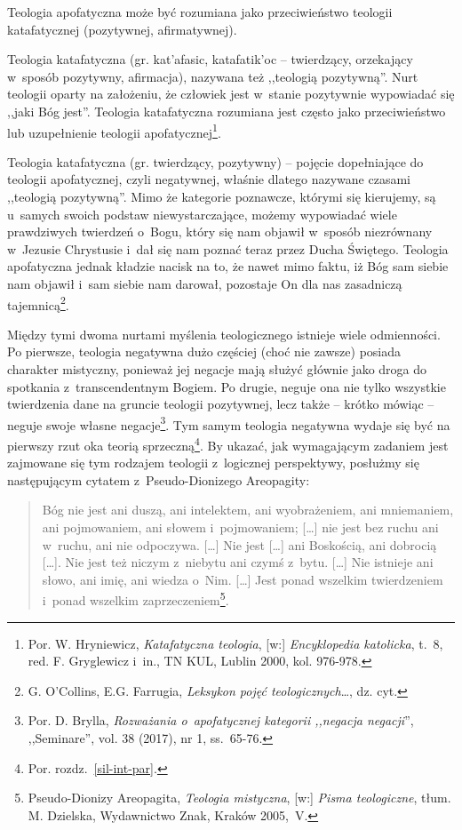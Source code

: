 Teologia apofatyczna może być rozumiana jako przeciwieństwo teologii katafatycznej (pozytywnej, afirmatywnej).


\begin{defin}
Teologia katafatyczna (gr. \textgreek{kat'afasic}, \textgreek{katafatik'oc}  -- twierdzący, orzekający w~sposób pozytywny, afirmacja), nazywana też ,,teologią pozytywną''. Nurt teologii oparty na założeniu, że człowiek jest w~stanie pozytywnie wypowiadać się ,,jaki Bóg jest''. Teologia katafatyczna rozumiana jest często jako przeciwieństwo lub uzupełnienie teologii apofatycznej\footnote{Por. W. Hryniewicz, \textit{Katafatyczna teologia}, [w:] \textit{Encyklopedia katolicka}, t.~8, red. F. Gryglewicz i~in., TN KUL, Lublin 2000, kol. 976-978.}.
\end{defin}
\begin{defin}
Teologia katafatyczna (gr. twierdzący, pozytywny) -- pojęcie dopełniające do teologii apofatycznej, czyli negatywnej, właśnie dlatego nazywane czasami ,,teologią pozytywną''. Mimo że kategorie poznawcze, którymi się kierujemy, są u~samych swoich podstaw niewystarczające, możemy wypowiadać wiele prawdziwych twierdzeń o~Bogu, który się nam objawił w~sposób niezrównany w~Jezusie Chrystusie i~dał się nam poznać teraz przez Ducha Świętego. Teologia apofatyczna jednak kładzie nacisk na to, że nawet mimo faktu, iż Bóg sam siebie nam objawił i~sam siebie nam darował, pozostaje On dla nas zasadniczą tajemnicą\footnote{G. O'Collins, E.G. Farrugia, \textit{Leksykon pojęć teologicznych}\ldots, dz. cyt.}.
\end{defin}

Między tymi dwoma nurtami myślenia teologicznego istnieje wiele odmienności. Po pierwsze, teologia negatywna dużo częściej (choć nie zawsze) posiada charakter mistyczny, ponieważ jej negacje mają służyć głównie jako droga do spotkania z~transcendentnym Bogiem. Po drugie, neguje ona nie tylko wszystkie twierdzenia dane na gruncie teologii pozytywnej, lecz także -- krótko mówiąc -- neguje swoje własne negacje\footnote{Por. D. Brylla, \textit{Rozważania o~apofatycznej kategorii ,,negacja negacji}'', ,,Seminare'', vol. 38 (2017), nr 1, ss.~65-76.}. Tym samym teologia negatywna wydaje się być na pierwszy rzut oka teorią sprzeczną\footnote{Por. rozdz.~\ref{sil-int-par}.}. By ukazać, jak wymagającym zadaniem jest zajmowane się tym rodzajem teologii z~logicznej perspektywy, posłużmy się następującym cytatem z~Pseudo-Dionizego Areopagity:

\begin{quote}
Bóg nie jest ani duszą, ani intelektem, ani wyobrażeniem, ani mniemaniem, ani pojmowaniem, ani słowem i~pojmowaniem; [\ldots] nie jest bez ruchu ani w~ruchu, ani nie odpoczywa. [\ldots] Nie jest [\ldots] ani Boskością, ani dobrocią [\ldots]. Nie jest też niczym z~niebytu ani czymś z~bytu. [\ldots] Nie istnieje ani słowo, ani imię, ani wiedza o~Nim. [\ldots] Jest ponad wszelkim twierdzeniem i~ponad wszelkim zaprzeczeniem\footnote{Pseudo-Dionizy Areopagita, \textit{Teologia mistyczna}, [w:] \textit{Pisma teologiczne}, tłum. M. Dzielska, Wydawnictwo Znak, Kraków 2005,~V.}.
\end{quote}

